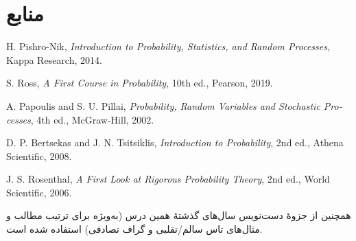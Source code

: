 \chapter*{منابع}

\begin{latin}
\begin{enumerate}[label={\color{primary}[\arabic*]}, leftmargin=2.4em, itemsep=8pt]
  \item H. Pishro-Nik, \textit{Introduction to Probability, Statistics, and Random Processes}, Kappa Research, 2014.\\
  \item S. Ross, \textit{A First Course in Probability}, 10th ed., Pearson, 2019.\\
  \item A. Papoulis and S. U. Pillai, \textit{Probability, Random Variables and Stochastic Processes}, 4th ed., McGraw-Hill, 2002.\\
  \item D. P. Bertsekas and J. N. Tsitsiklis, \textit{Introduction to Probability}, 2nd ed., Athena Scientific, 2008.\\
  \item J. S. Rosenthal, \textit{A First Look at Rigorous Probability Theory}, 2nd ed., World Scientific, 2006.\\
\end{enumerate}
\end{latin}

\medskip
همچنین از جزوهٔ دست‌نویس سال‌های گذشتهٔ همین درس (به‌ویژه برای ترتیب مطالب و مثال‌های تاس سالم/تقلبی و گراف تصادفی) استفاده شده است.
